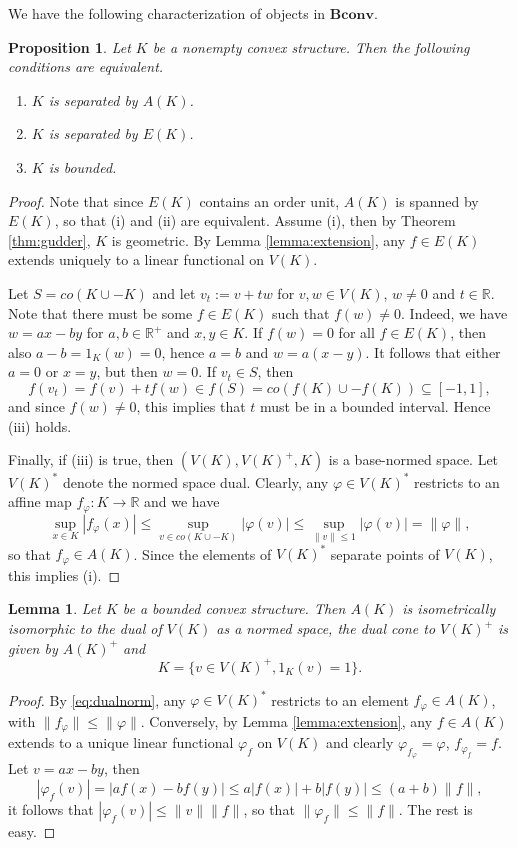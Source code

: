 \documentclass[12pt]{article}
\newtheorem{lemma}{Lemma}
\newtheorem{prop}{Proposition}
\newcommand{\<}{\langle}
\newcommand{\ct}[1]{\mathbf{#1}}
\begin{document}
We have the following characterization of objects in $\ct{Bconv}$.
\begin{prop}\label{prop:bounded} Let $K$ be a nonempty convex structure. Then the following conditions  are equivalent.
\begin{enumerate}
\item[(i)] $K$ is separated by $A(K)$.
\item[(ii)] $K$ is separated by $E(K)$.
\item[(iii)] $K$ is bounded.
\end{enumerate}

\end{prop}


\begin{proof} Note that since $E(K)$ contains an order unit, $A(K)$ is spanned by $E(K)$, so that (i) and (ii) are equivalent. Assume 
(i), then by Theorem \ref{thm:gudder}, $K$ is geometric. By Lemma \ref{lemma:extension}, any $f\in E(K)$ extends uniquely to a linear functional on $V(K)$. 

Let $S=co(K\cup -K)$ and let $v_t:=v+tw$ for $v,w\in V(K)$, $w\ne 0$ and $t\in \mathbb R$. 
Note that there must be some $f\in E(K)$ such that $f(w)\ne0$. Indeed, we have $w=ax-by$ for $a,b\in \mathbb R^+$ and $x,y\in K$. If $f(w)=0$ for all $f\in E(K)$, 
 then also $a-b=1_K(w)=0$, hence $a=b$ and $w=a(x-y)$. It follows that either $a=0$ or $x=y$, but then $w=0$. If $v_t\in S$, 
  then 
  \[
  f(v_t)=f(v)+tf(w)\in f(S)=co(f(K)\cup -f(K))\subseteq [-1,1],
  \]
   and since $f(w)\ne 0$, this implies that $t$ must be in a bounded interval. Hence (iii) holds. 

Finally, if (iii) is true, then $(V(K), V(K)^+, K)$ is a base-normed space. Let $V(K)^*$ denote the normed space dual. 
Clearly, any $\varphi\in V(K)^*$ restricts to an affine map 
$f_\varphi:K\to \mathbb R$ and  we have
\begin{equation}\label{eq:dualnorm}
\sup_{x\in K} |f_\varphi(x)|\le \sup_{v\in co(K\cup -K)}|\varphi(v)|\le \sup_{\|v\|\le 1}|\varphi(v)|=\|\varphi\|,
\end{equation}
so that $f_\varphi\in A(K)$. Since the elements of $V(K)^*$ separate points of $V(K)$, this implies (i).


\end{proof}


\begin{lemma} Let $K$ be a bounded convex structure. Then  $A(K)$ is isometrically isomorphic to the dual of $V(K)$ as a normed space,  the dual cone to $V(K)^+$ is given by $A(K)^+$ and 
\[
K=\{v\in V(K)^+, 1_K(v)=1\}.
\]
\end{lemma}

\begin{proof} By \eqref{eq:dualnorm}, any $\varphi\in V(K)^*$ restricts to an  element  
 $f_\varphi\in A(K)$, with $\|f_\varphi\|\le \|\varphi\|$.  Conversely, by Lemma \ref{lemma:extension}, any $f\in A(K)$ extends to a unique linear functional $\varphi_f$ on $V(K)$
and clearly $\varphi_{f_\varphi}=\varphi$, $f_{\varphi_f}=f$. Let $v=ax-by$, then
\[
|\varphi_f(v)|=|af(x)-bf(y)|\le a|f(x)|+b|f(y)|\le (a+b)\|f\|,
\]
it follows that $|\varphi_f(v)|\le \|v\|\|f\|$, so that $\|\varphi_f\|\le \|f\|$. The rest is easy.


\end{proof}
\end{document}
